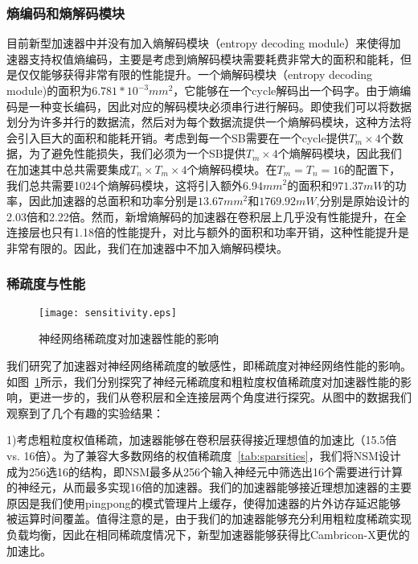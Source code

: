 \subsubsection{熵编码和熵解码模块}
\label{subsubsec:encoding_hw}

目前新型加速器中并没有加入熵解码模块（entropy decoding module）来使得加速器支持权值熵编码，主要是考虑到熵解码模块需要耗费非常大的面积和能耗，但是仅仅能够获得非常有限的性能提升。一个熵解码模块（entropy decoding module)的面积为$6.781*10^{-3}mm^2$，它能够在一个cycle解码出一个码字。由于熵编码是一种变长编码，因此对应的解码模块必须串行进行解码。即使我们可以将数据划分为许多并行的数据流，然后对为每个数据流提供一个熵解码模块，这种方法将会引入巨大的面积和能耗开销。考虑到每一个SB需要在一个cycle提供$T_m\times 4$个数据，为了避免性能损失，我们必须为一个SB提供$T_m\times 4$个熵解码模块，因此我们在加速其中总共需要集成$T_n\times T_m\times 4$个熵解码模块。在$T_m = T_n = 16$的配置下，我们总共需要1024个熵解码模块，这将引入额外$6.94mm^2$的面积和$971.37mW$的功率，因此加速器的总面积和功率分别是$13.67mm^2$和$1769.92mW$,分别是原始设计的2.03倍和2.22倍。然而，新增熵解码的加速器在卷积层上几乎没有性能提升，在全连接层也只有1.18倍的性能提升，对比与额外的面积和功率开销，这种性能提升是非常有限的。因此，我们在加速器中不加入熵解码模块。

\subsubsection{稀疏度与性能}
\begin{figure}[h]
\centering
\texttt{[image: sensitivity.eps]}
\caption{神经网络稀疏度对加速器性能的影响}
\label{fig:sensitivity}
\end{figure}

我们研究了加速器对神经网络稀疏度的敏感性，即稀疏度对神经网络性能的影响。如图~\ref{fig:sensitivity}所示，我们分别探究了神经元稀疏度和粗粒度权值稀疏度对加速器性能的影响，更进一步的，我们从卷积层和全连接层两个角度进行探究。从图中的数据我们观察到了几个有趣的实验结果：

1)考虑粗粒度权值稀疏，加速器能够在卷积层获得接近理想值的加速比（15.5倍 vs. 16倍）。为了兼容大多数网络的权值稀疏度~\ref{tab:sparsities}，我们将NSM设计成为256选16的结构，即NSM最多从256个输入神经元中筛选出16个需要进行计算的神经元，从而最多实现16倍的加速器。我们的加速器能够接近理想加速器的主要原因是我们使用pingpong的模式管理片上缓存，使得加速器的片外访存延迟能够被运算时间覆盖。值得注意的是，由于我们的加速器能够充分利用粗粒度稀疏实现负载均衡，因此在相同稀疏度情况下，新型加速器能够获得比Cambricon-X更优的加速比。

